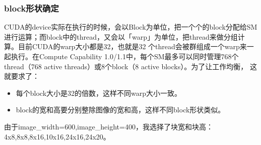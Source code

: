 \documentclass[UTF8, a4paper, 11pt]{article}
\begin{document}
\subsubsection{block形状确定}
CUDA的device实际在执行的时候，会以Block为单位，把一个个的block分配给SM进行运算；而block中的thread，又会以「warp」为单位，把thread来做分组计算。目前CUDA的warp大小都是32，也就是32
个thread会被群组成一个warp来一起执行。在Compute Capability 1.0/1.1中，每个SM最多可以同时管理768个thread（768 active threads）或8个block（8 active blocks）。为了让工作均衡，
这就要求了：
\begin{itemize}
    \item 每个block大小是32的倍数，这样不同warp大小一致。
    \item block的宽和高要分别整除图像的宽和高，这样不同block形状类似。
\end{itemize}
由于image\_width=600,image\_height=400，我选择了块宽和块高：4x8,8x8,8x16,10x16,24x16,24x20。
\end{document}
